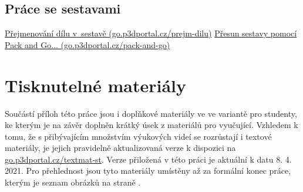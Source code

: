 \section{Práce se sestavami} \label{videa-sestavy}
\href{https://go.p3dportal.cz/prejm-dilu}{Přejmenování dílu v~sestavě (go.p3dportal.cz/prejm-dilu)} \newline
\href{https://go.p3dportal.cz/pack-and-go}{Přesun sestavy pomocí Pack and Go... (go.p3dportal.cz/pack-and-go)} \newline

\chapter{Tisknutelné materiály}
Součástí příloh této práce jsou i doplňkové materiály ve ve variantě pro studenty, ke kterým je na závěr doplněn krátký úsek z materiálů pro vyučující.
Vzhledem k tomu, že s přibývajícím množstvím výukových videí se rozrůstají i textové materiály, je jejich pravidelně aktualizovaná verze k dispozici na \href{https://go.p3dportal.cz/textmat-st}{go.p3dportal.cz/textmat-st}.
Verze přiložená v této práci je aktuální k datu 8. 4. 2021.
Pro přehlednost jsou tyto materiály umístěny až za formální konec práce, kterým je seznam obrázků na straně \pageref{listoffigures}.

